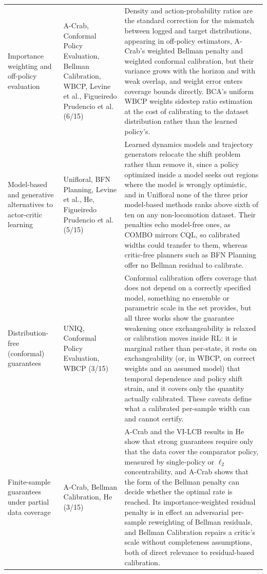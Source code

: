 \documentclass[11pt]{article}
\begin{document}
{\begin{longtable}{P{3.4cm} P{3.6cm} P{8.2cm}}
\addlinespace
Importance weighting and off-policy evaluation & A-Crab, Conformal Policy Evaluation, Bellman Calibration, WBCP, Levine et al., Figueiredo Prudencio et al. (6/15) & Density and action-probability ratios are the standard correction for the mismatch between logged and target distributions, appearing in off-policy estimators, A-Crab's weighted Bellman penalty and weighted conformal calibration, but their variance grows with the horizon and with weak overlap, and weight error enters coverage bounds directly. BCA's uniform WBCP weights sidestep ratio estimation at the cost of calibrating to the dataset distribution rather than the learned policy's. \\
\addlinespace
Model-based and generative alternatives to actor-critic learning & Unifloral, BFN Planning, Levine et al., He, Figueiredo Prudencio et al. (5/15) & Learned dynamics models and trajectory generators relocate the shift problem rather than remove it, since a policy optimized inside a model seeks out regions where the model is wrongly optimistic, and in Unifloral none of the three prior model-based methods ranks above sixth of ten on any non-locomotion dataset. Their penalties echo model-free ones, as COMBO mirrors CQL, so calibrated widths could transfer to them, whereas critic-free planners such as BFN Planning offer no Bellman residual to calibrate. \\
\addlinespace
Distribution-free (conformal) guarantees & UNIQ, Conformal Policy Evaluation, WBCP (3/15) & Conformal calibration offers coverage that does not depend on a correctly specified model, something no ensemble or parametric scale in the set provides, but all three works show the guarantee weakening once exchangeability is relaxed or calibration moves inside RL: it is marginal rather than per-state, it rests on exchangeability (or, in WBCP, on correct weights and an assumed model) that temporal dependence and policy shift strain, and it covers only the quantity actually calibrated. These caveats define what a calibrated per-sample width can and cannot certify. \\
\addlinespace
Finite-sample guarantees under partial data coverage & A-Crab, Bellman Calibration, He (3/15) & A-Crab and the VI-LCB results in He show that strong guarantees require only that the data cover the comparator policy, measured by single-policy or $\ell_2$ concentrability, and A-Crab shows that the form of the Bellman penalty can decide whether the optimal rate is reached. Its importance-weighted residual penalty is in effect an adversarial per-sample reweighting of Bellman residuals, and Bellman Calibration repairs a critic's scale without completeness assumptions, both of direct relevance to residual-based calibration. \\

\end{longtable}}
\end{document}
